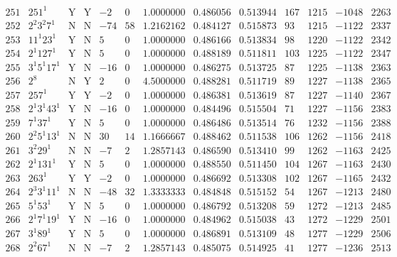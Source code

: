 \documentclass[11pt,reqno,a4letter]{article}
\numberwithin{equation}{section}
\numberwithin{figure}{section}
\numberwithin{table}{section}
\theoremstyle{plain}
\numberwithin{theorem}{section}
\theoremstyle{definition}
\begin{document}
\begin{table}[ht]
\begin{equation*}
{\begin{array}{cc|cc|ccc|cc|cccc}
 251 & 251^1 & \text{Y} & \text{Y} & -2 & 0 & 1.0000000 & 0.486056 & 0.513944 & 167 & 1215 & -1048 & 2263 \\
 252 & 2^2 3^2 7^1 & \text{N} & \text{N} & -74 & 58 & 1.2162162 & 0.484127 & 0.515873 & 93 & 1215 & -1122 & 2337 \\
 253 & 11^1 23^1 & \text{Y} & \text{N} & 5 & 0 & 1.0000000 & 0.486166 & 0.513834 & 98 & 1220 & -1122 & 2342 \\
 254 & 2^1 127^1 & \text{Y} & \text{N} & 5 & 0 & 1.0000000 & 0.488189 & 0.511811 & 103 & 1225 & -1122 & 2347 \\
 255 & 3^1 5^1 17^1 & \text{Y} & \text{N} & -16 & 0 & 1.0000000 & 0.486275 & 0.513725 & 87 & 1225 & -1138 & 2363 \\
 256 & 2^8 & \text{N} & \text{Y} & 2 & 0 & 4.5000000 & 0.488281 & 0.511719 & 89 & 1227 & -1138 & 2365 \\
 257 & 257^1 & \text{Y} & \text{Y} & -2 & 0 & 1.0000000 & 0.486381 & 0.513619 & 87 & 1227 & -1140 & 2367 \\
 258 & 2^1 3^1 43^1 & \text{Y} & \text{N} & -16 & 0 & 1.0000000 & 0.484496 & 0.515504 & 71 & 1227 & -1156 & 2383 \\
 259 & 7^1 37^1 & \text{Y} & \text{N} & 5 & 0 & 1.0000000 & 0.486486 & 0.513514 & 76 & 1232 & -1156 & 2388 \\
 260 & 2^2 5^1 13^1 & \text{N} & \text{N} & 30 & 14 & 1.1666667 & 0.488462 & 0.511538 & 106 & 1262 & -1156 & 2418 \\
 261 & 3^2 29^1 & \text{N} & \text{N} & -7 & 2 & 1.2857143 & 0.486590 & 0.513410 & 99 & 1262 & -1163 & 2425 \\
 262 & 2^1 131^1 & \text{Y} & \text{N} & 5 & 0 & 1.0000000 & 0.488550 & 0.511450 & 104 & 1267 & -1163 & 2430 \\
 263 & 263^1 & \text{Y} & \text{Y} & -2 & 0 & 1.0000000 & 0.486692 & 0.513308 & 102 & 1267 & -1165 & 2432 \\
 264 & 2^3 3^1 11^1 & \text{N} & \text{N} & -48 & 32 & 1.3333333 & 0.484848 & 0.515152 & 54 & 1267 & -1213 & 2480 \\
 265 & 5^1 53^1 & \text{Y} & \text{N} & 5 & 0 & 1.0000000 & 0.486792 & 0.513208 & 59 & 1272 & -1213 & 2485 \\
 266 & 2^1 7^1 19^1 & \text{Y} & \text{N} & -16 & 0 & 1.0000000 & 0.484962 & 0.515038 & 43 & 1272 & -1229 & 2501 \\
 267 & 3^1 89^1 & \text{Y} & \text{N} & 5 & 0 & 1.0000000 & 0.486891 & 0.513109 & 48 & 1277 & -1229 & 2506 \\
 268 & 2^2 67^1 & \text{N} & \text{N} & -7 & 2 & 1.2857143 & 0.485075 & 0.514925 & 41 & 1277 & -1236 & 2513 \\

\end{array}}
\end{equation*}
\end{table}
\end{document}
